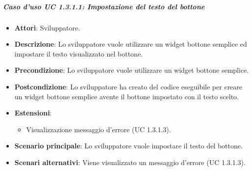 \newpage
\subparagraph{Caso d'uso UC 1.3.1.1: Impostazione del testo del bottone}
\FloatBarrier
\begin{itemize}
\item\textbf{Attori}: Sviluppatore.
\item\textbf{Descrizione}: Lo sviluppatore vuole utilizzare un widget bottone semplice ed impostare il testo visualizzato nel bottone.
\item\textbf{Precondizione}: Lo sviluppatore vuole utilizzare un widget bottone semplice.
\item\textbf{Postcondizione}: Lo sviluppatore ha creato del codice eseguibile per creare un widget bottone semplice avente il bottone impostato con il testo scelto.
\item \textbf{Estensioni}: 
\begin{itemize}
\item Visualizzazione messaggio d'errore (UC 1.3.1.3).
\end{itemize}
\item \textbf{Scenario principale}: Lo sviluppatore vuole impostare il testo del bottone.
\item \textbf{Scenari alternativi}: Viene visualizzato un messaggio d'errore (UC 1.3.1.3).
\end{itemize}
